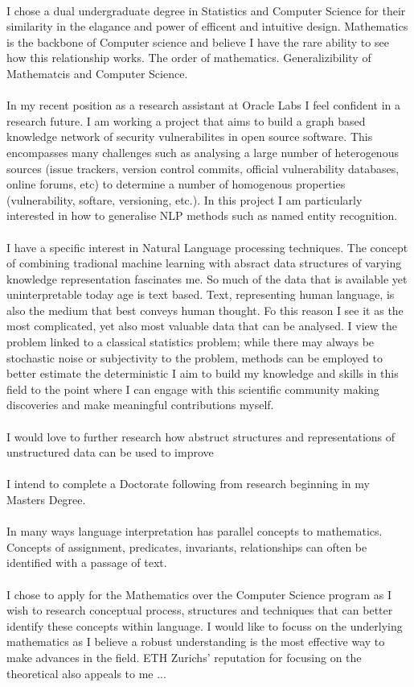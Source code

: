 \\
I chose a dual undergraduate degree in Statistics and Computer Science for their similarity in the elagance and power of efficent and intuitive design. Mathematics is the backbone of Computer science and believe I have the rare ability to see how this relationship works. The order of mathematics. Generalizibility of Mathematcis and Computer Science.\\
\\
In my recent position as a research assistant at Oracle Labs I feel confident in a research future. I am working a project that aims to build a graph based knowledge network of security vulnerabilites in open source software. This encompasses many challenges such as analysing a large number of heterogenous sources (issue trackers, version control commits, official vulnerability databases, online forums, etc) to determine a number of homogenous properties (vulnerability, softare, versioning, etc.). In this project I am particularly interested in how to generalise NLP methods such as named entity recognition.\\
\\
I have a specific interest in Natural Language processing techniques. The concept of combining tradional machine learning with absract data structures of varying knowledge representation fascinates me. So much of the data that is available yet uninterpretable today age is text based. Text, representing human language, is also the medium that best conveys human thought. Fo this reason I see it as the most complicated, yet also most valuable data that can be analysed. I view the problem linked to a classical statistics problem; while there may always be stochastic noise or subjectivity to the problem, methods can be employed to better estimate the deterministic  I aim to build my knowledge and skills in this field to the point where I can engage with this scientific community making discoveries and make meaningful contributions myself.\\
\\
I would love to further research how abstruct structures and representations of unstructured data can be used to improve \\
\\
I intend to complete a Doctorate following from research beginning in my Masters Degree.\\
\\
In many ways language interpretation has parallel concepts to mathematics. Concepts of assignment, predicates, invariants, relationships can often be identified with a passage of text.\\
\\
I chose to apply for the Mathematics over the Computer Science program as I wish to research conceptual process, structures and techniques that can better identify these concepts within language. I would like to focuss on the underlying mathematics as I believe a robust understanding is the most effective way to make advances in the field. ETH Zurichs' reputation for focusing on the theoretical also appeals to me ...